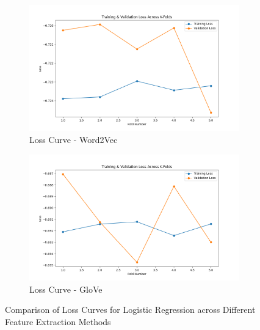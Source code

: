 \begin{figure}[H]
    \begin{subfigure}[b]{0.48\textwidth}
        \includegraphics[width=\textwidth]{img/report_info/img/1.1.LogisticRegression/best_logistic_regression_word2vec_loss.png}
        \caption{Loss Curve - Word2Vec}
        \label{fig:lr-word2vec-loss}
    \end{subfigure}
    \begin{subfigure}[b]{0.48\textwidth}
        \includegraphics[width=\textwidth]{img/report_info/img/1.1.LogisticRegression/best_logistic_regression_glove_loss.png}
        \caption{Loss Curve - GloVe}
        \label{fig:lr-glove-loss}
    \end{subfigure}
    
    \caption{Comparison of Loss Curves for Logistic Regression across Different Feature Extraction Methods}
    \label{fig:lr-loss-group}
\end{figure}

